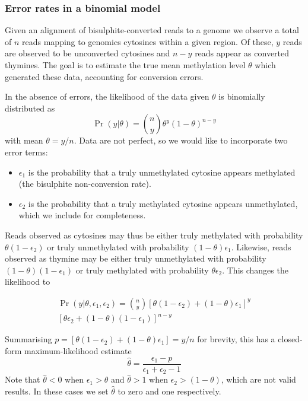 \documentclass[10pt,draft,letterpaper]{article}
\begin{document}
\subsubsection*{Error rates in a binomial model} \label{sec:binomial-with-errors}

Given an alignment of bisulphite-converted reads to a genome we observe a total of $n$ reads mapping to genomics cytosines within a given region.
Of these, $y$ reads are observed to be unconverted cytosines and $n-y$ reads appear as converted thymines.
The goal is to estimate the true mean methylation level $\theta$ which generated these data, accounting for conversion errors.

In the absence of errors, the likelihood of the data given $\theta$ is binomially distributed as
\begin{equation}
    \label{eqn:classic-binomial}
    \Pr(y | \theta) = \binom{n}{y} \theta^y(1-\theta)^{n-y}
\end{equation}
with mean $\theta=y/n$.
Data are not perfect, so we would like to incorporate two error terms:
\begin{itemize}
    \item $\epsilon_1$ is the probability that a truly unmethylated cytosine appears methylated (the bisulphite non-conversion rate).
    \item $\epsilon_2$ is the probability that a truly methylated cytosine appears unmethylated, which we include for completeness.
\end{itemize}
Reads observed as cytosines may thus be either truly methylated with probability $\theta(1-\epsilon_2)$ or truly unmethylated with probability $(1-\theta)\epsilon_1$. Likewise, reads observed as thymine may be either truly unmethylated with probability $(1-\theta)(1-\epsilon_1)$ or truly methylated with probability $\theta \epsilon_2$.
This changes the likelihood to

\begin{equation}
\begin{split}
    \label{eqn:binom-with-errors}
    \Pr(y | \theta, \epsilon_1, \epsilon_2) = 
    {n \choose y}
    [\theta(1-\epsilon_2) + (1-\theta)\epsilon_1]^y \\
    [\theta \epsilon_2 + (1-\theta)(1-\epsilon_1)]^{n-y}
\end{split}
\end{equation}

Summarising $p=[\theta(1-\epsilon_2) + (1-\theta)\epsilon_1] = y/n$ for brevity, this has a closed-form maximum-likelihood estimate
\begin{equation}
    \label{eqn:ml-theta}
    \hat{\theta} = \frac{\epsilon_1-p}{\epsilon_1 + \epsilon_2 -1}
\end{equation}
Note that $\hat{\theta}<0$ when $\epsilon_1 > \theta$ and $\hat{\theta}>1$ when $\epsilon_2 > (1-\theta)$, which are not valid results.
In these cases we set $\hat{\theta}$ to zero and one respectively.
\end{document}
